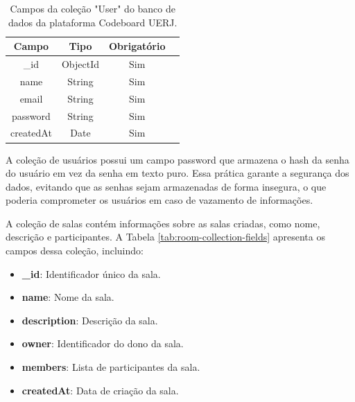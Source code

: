 \begin{table}[H]
    \centering
    \renewcommand{\arraystretch}{1.3} 
    \begin{tabular}{|c|c|c|c|}
        \hline
        \textbf{Campo}   & \textbf{Tipo} & \textbf{Obrigatório} \\
        \hline
        \_id            & ObjectId      & Sim                  \\
        \hline
        name              & String        & Sim                  \\
        \hline
        email              & String        & Sim                  \\
        \hline
        password         & String        & Sim                  \\
        \hline
        createdAt        & Date          & Sim                  \\
        \hline
    \end{tabular}
    \caption{Campos da coleção "User" do banco de dados da plataforma Codeboard UERJ.}
    \label{tab:user-collection-fields}
\end{table}

A coleção de usuários possui um campo password que armazena o hash da senha do usuário em vez da senha em texto puro. Essa prática garante a segurança dos dados, evitando que as senhas sejam armazenadas de forma insegura, o que poderia comprometer os usuários em caso de vazamento de informações.


A coleção de salas contém informações sobre as salas criadas, como nome, descrição e participantes. A Tabela \ref{tab:room-collection-fields} apresenta os campos dessa coleção, incluindo:

\begin{itemize}
    \item \textbf{\_id}: Identificador único da sala.
    \item \textbf{name}: Nome da sala.
    \item \textbf{description}: Descrição da sala.
    \item \textbf{owner}: Identificador do dono da sala.
    \item \textbf{members}: Lista de participantes da sala.
    \item \textbf{createdAt}: Data de criação da sala.
\end{itemize}

